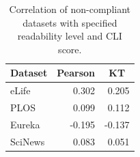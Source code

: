 \begin{table}[h!]
\vspace{-3mm}
\centering\footnotesize
\begin{tabular}{l|rr}
Dataset & \multicolumn{1}{r}{Pearson} & \multicolumn{1}{c}{KT} \\ \hline
eLife & 0.302 & 0.205 \\
PLOS & 0.099 &  0.112 \\
Eureka & -0.195 & -0.137 \\
SciNews & 0.083 & 0.051
\end{tabular} 
\caption{Correlation of non-compliant datasets with specified readability level and CLI score.}
\label{tab:other-dataset-results}
\vspace{-4mm}
\end{table}